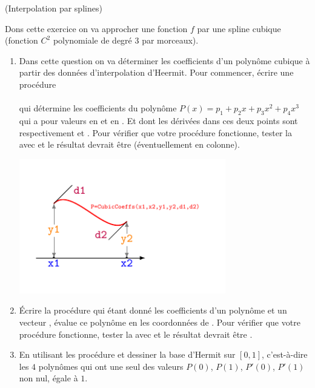 \documentclass[a4paper,12pt,reqno]{amsart}
\begin{document}
\newpage
\begin{exo} (Interpolation par splines)

  Dons cette exercice on va approcher une fonction $f$ par une spline cubique (fonction $C^{2}$ polynomiale de degré $3$ par morceaux).
  \begin{enumerate}
    \item Dans cette question on va déterminer les coefficients d'un polynôme cubique à partir des données d'interpolation d'Heermit. Pour commencer, écrire une procédure\\
    \indent {}\\
    qui détermine les coefficients  du polynôme $P(x)= p_{1}+p_{2}x+p_{3}x^{2}+p_{4}x^{3}$ qui a pour valeurs  en  et  en . Et dont les dérivées dans ces deux points sont respectivement  et . Pour vérifier que votre procédure fonctionne, tester la avec  et le résultat devrait être  (éventuellement en colonne).
    \begin{center}
      \includegraphics[width=9cm]{CubbicCoeffs}
    \end{center}

    \item Écrire la procédure  qui étant donné les coefficients  d'un polynôme et un vecteur , évalue ce polynôme en les coordonnées de . Pour vérifier que votre procédure fonctionne, tester la avec  et le résultat devrait être .

    \item En utilisant les procédure  et  dessiner la base d'Hermit sur $[0,1]$, c'est-à-dire les $4$ polynômes qui ont une seul des valeurs $P(0)$, $P(1)$, $P'(0)$, $P'(1)$ non nul, égale à $1$.


\end{enumerate}
\end{exo}
\end{document}
